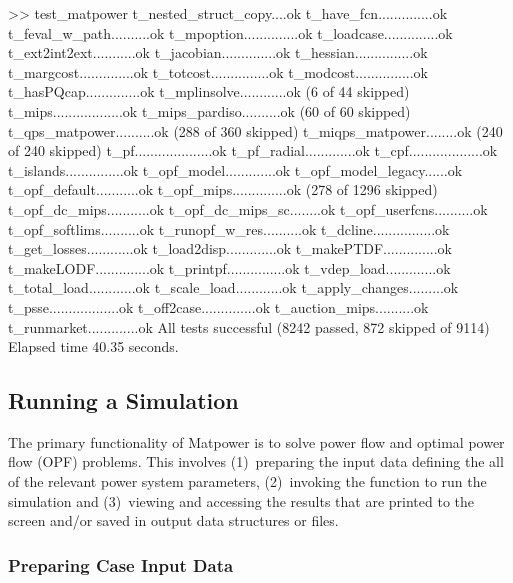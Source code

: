 \documentclass[12pt]{article}
\newcommand{\matpower}[0]{{\sc Matpower}}
\numberwithin{equation}{section}
\numberwithin{table}{section}
\numberwithin{figure}{section}
\begin{document}
\begin{enumerate}
\begin{Code}
>> test_matpower
t_nested_struct_copy....ok
t_have_fcn..............ok
t_feval_w_path..........ok
t_mpoption..............ok
t_loadcase..............ok
t_ext2int2ext...........ok
t_jacobian..............ok
t_hessian...............ok
t_margcost..............ok
t_totcost...............ok
t_modcost...............ok
t_hasPQcap..............ok
t_mplinsolve............ok (6 of 44 skipped)
t_mips..................ok
t_mips_pardiso..........ok (60 of 60 skipped)
t_qps_matpower..........ok (288 of 360 skipped)
t_miqps_matpower........ok (240 of 240 skipped)
t_pf....................ok
t_pf_radial.............ok
t_cpf...................ok
t_islands...............ok
t_opf_model.............ok
t_opf_model_legacy......ok
t_opf_default...........ok
t_opf_mips..............ok (278 of 1296 skipped)
t_opf_dc_mips...........ok
t_opf_dc_mips_sc........ok
t_opf_userfcns..........ok
t_opf_softlims..........ok
t_runopf_w_res..........ok
t_dcline................ok
t_get_losses............ok
t_load2disp.............ok
t_makePTDF..............ok
t_makeLODF..............ok
t_printpf...............ok
t_vdep_load.............ok
t_total_load............ok
t_scale_load............ok
t_apply_changes.........ok
t_psse..................ok
t_off2case..............ok
t_auction_mips..........ok
t_runmarket.............ok
All tests successful (8242 passed, 872 skipped of 9114)
Elapsed time 40.35 seconds.
\end{Code}
\end{enumerate}

\subsection{Running a Simulation}
\label{sec:runsimulation}

The primary functionality of \matpower{} is to solve power flow and optimal power flow (OPF) problems. This involves (1)~preparing the input data defining the all of the relevant power system parameters, (2)~invoking the function to run the simulation and (3)~viewing and accessing the results that are printed to the screen and/or saved in output data structures or files.

\subsubsection{Preparing Case Input Data}
\label{sec:prepdata}
\end{document}
